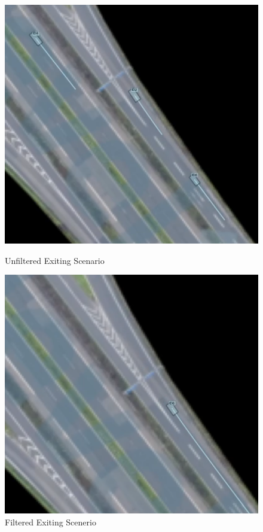 \begin{figure}[htbp]
    \centering
    \begin{minipage}[b]{0.45\columnwidth}
        \centering
        \includegraphics[width=\columnwidth]{images/figures/Filtering1.png}
        \caption{Unfiltered Exiting Scenario}
        \label{fig:unfiltered}
    \end{minipage}
    \hfill
    \begin{minipage}[b]{0.45\columnwidth}
        \centering
        \includegraphics[width=\columnwidth]{images/figures/Filtering2.png}
        \caption{Filtered Exiting Scenerio}
        \label{fig:filtered}
    \end{minipage}
    \label{fig:cfiltered}
\end{figure}

